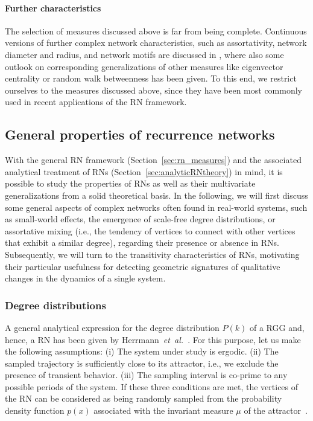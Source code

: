 \paragraph{Further characteristics}

The selection of measures discussed above is far from being complete. Continuous versions of further complex network characteristics, such as assortativity, network diameter and radius, and network motifs are discussed in \cite{Donges2012}, where also some outlook on corresponding generalizations of other measures like eigenvector centrality or random walk betweenness has been given. To this end, we restrict ourselves to the measures discussed above, since they have been most commonly used in recent applications of the RN framework.

		 	 		 
	\subsection{General properties of recurrence networks}
		With the general RN framework (Section~\ref{sec:rn_measures}) and the associated analytical treatment of RNs (Section~\ref{sec:analyticRNtheory}) in mind, it is possible to study the properties of RNs as well as their multivariate generalizations from a solid theoretical basis. In the following, we will first discuss some general aspects of complex networks often found in real-world systems, such as small-world effects, the emergence of scale-free degree distributions, or assortative mixing (i.e., the tendency of vertices to connect with other vertices that exhibit a similar degree), regarding their presence or absence in RNs. Subsequently, we will turn to the transitivity characteristics of RNs, motivating their particular usefulness for detecting geometric signatures of qualitative changes in the dynamics of a single system. %
        
       		\subsubsection{Degree distributions} \label{sec:scaling}
		A general analytical expression for the degree distribution $P(k)$ of a RGG and, hence, a RN has been given by Herrmann~\textit{et~al.}~\cite{Herrmann2003}. For this purpose, let us make the following assumptions: (i) The system under study is ergodic. (ii) The sampled trajectory is sufficiently close to its attractor, i.e., we exclude the presence of transient behavior. (iii) The sampling interval is co-prime to any possible periods of the system. If these three conditions are met, the vertices of the RN can be considered as being randomly sampled from the probability density function $p(x)$ associated with the invariant measure $\mu$ of the attractor~\cite{Eckmann1985}. 

